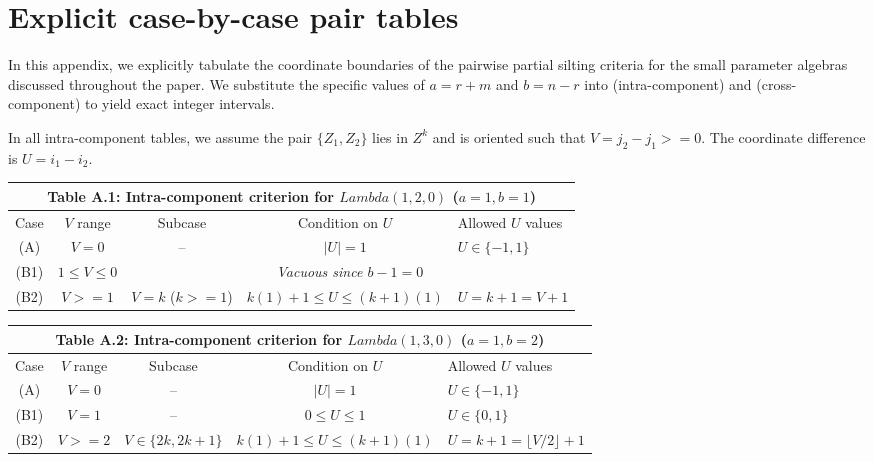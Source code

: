 \documentclass[11pt, a4paper]{article}
\theoremstyle{definition}
\def\Lambda{Lambda}%
\def\ge{>=}%
\def\mathcal#1{#1}%
\begin{document}

\appendix

\section{Explicit case-by-case pair tables}
\label{app:tables}

In this appendix, we explicitly tabulate the coordinate boundaries of the pairwise partial silting criteria for the small parameter algebras discussed throughout the paper. We substitute the specific values of $a=r+m$ and $b=n-r$ into  (intra-component) and  (cross-component) to yield exact integer intervals.

In all intra-component tables, we assume the pair $\{Z_1, Z_2\}$ lies in $\mathcal Z^k$ and is oriented such that $V = j_2 - j_1 \ge 0$. The coordinate difference is $U = i_1 - i_2$.

\begin{table}[htbp]
\centering
\small
\renewcommand{\arraystretch}{1.2}
\begin{tabular}{|c|c|c|c|l|}
\hline
\multicolumn{5}{|c|}{\textbf{Table A.1:} Intra-component criterion for $\Lambda(1,2,0)$ ($a=1, b=1$)} \\
\hline
Case & $V$ range & Subcase & Condition on $U$ & Allowed $U$ values \\
\hline
(A) & $V = 0$ & -- & $|U| = 1$ & $U \in \{-1, 1\}$ \\
(B1) & $1 \le V \le 0$ & \multicolumn{3}{c|}{\emph{Vacuous since $b-1 = 0$}} \\
(B2) & $V \ge 1$ & $V = k$ ($k \ge 1$) & $k(1) + 1 \le U \le (k+1)(1)$ & $U = k+1 = V+1$ \\
\hline
\end{tabular}
\end{table}

\begin{table}[htbp]
\centering
\small
\renewcommand{\arraystretch}{1.2}
\begin{tabular}{|c|c|c|c|l|}
\hline
\multicolumn{5}{|c|}{\textbf{Table A.2:} Intra-component criterion for $\Lambda(1,3,0)$ ($a=1, b=2$)} \\
\hline
Case & $V$ range & Subcase & Condition on $U$ & Allowed $U$ values \\
\hline
(A) & $V = 0$ & -- & $|U| = 1$ & $U \in \{-1, 1\}$ \\
(B1) & $V = 1$ & -- & $0 \le U \le 1$ & $U \in \{0, 1\}$ \\
(B2) & $V \ge 2$ & $V \in \{2k, 2k+1\}$ & $k(1) + 1 \le U \le (k+1)(1)$ & $U = k+1 = \lfloor V/2 \rfloor + 1$ \\
\hline
\end{tabular}
\end{table}
\end{document}
